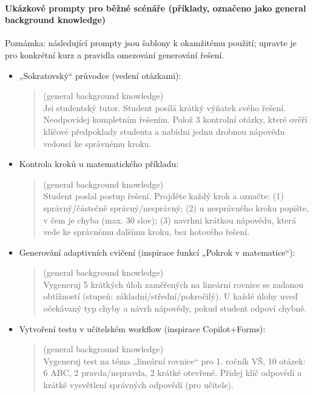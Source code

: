 \paragraph{Ukázkové prompty pro běžné scénáře (příklady, označeno jako general background knowledge)}
Poznámka: následující prompty jsou šablony k okamžitému použití; upravte je pro konkrétní kurz a pravidla omezování generování řešení.

\begin{itemize}
  \item „Sokratovský“ průvodce (vedení otázkami):
    \begin{quote}
      (general background knowledge) \\
      Jsi studentský tutor. Student posílá krátký výňatek svého řešení. Neodpovídej kompletním řešením. Polož 3 kontrolní otázky, které ověří klíčové předpoklady studenta a nabídni jednu drobnou nápovědu vedoucí ke správnému kroku.
    \end{quote}

  \item Kontrola kroků u matematického příkladu:
    \begin{quote}
      (general background knowledge) \\
      Student poslal postup řešení. Projděte každý krok a označte: (1) správný/částečně správný/nesprávný; (2) u nesprávného kroku popište, v čem je chyba (max. 30 slov); (3) navrhni krátkou nápovědu, která vede ke správnému dalšímu kroku, bez hotového řešení.
    \end{quote}

  \item Generování adaptivních cvičení (inspirace funkcí „Pokrok v matematice“):
    \begin{quote}
      (general background knowledge) \\
      Vygeneruj 5 krátkých úloh zaměřených na lineární rovnice se zadanou obtížností (stupeň: základní/střední/pokročilý). U každé úlohy uveď očekávaný typ chyby a návrh nápovědy, pokud student odpoví chybně.
    \end{quote}

  \item Vytvoření testu v učitelském workflow (inspirace Copilot+Forms):
    \begin{quote}
      (general background knowledge) \\
      Vygeneruj test na téma „lineární rovnice“ pro 1. ročník VŠ, 10 otázek: 6 ABC, 2 pravda/nepravda, 2 krátké otevřené. Přidej klíč odpovědí a krátké vysvětlení správných odpovědí (pro učitele).
    \end{quote}
\end{itemize}

